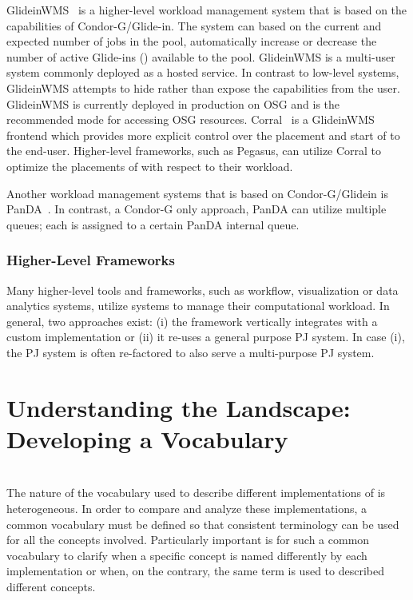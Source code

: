 \documentclass{sig-alternate}
\begin{document}
GlideinWMS~\cite{1742-6596-119-6-062044} is a higher-level workload management
system that is based on the \pilot capabilities of Condor-G/Glide-in. The
system can based on the current and expected number of jobs in the pool,
automatically increase or decrease the number of active Glide-ins (\pilots)
available to the pool. GlideinWMS is a multi-user \pilotjob system commonly
deployed as a hosted service. In contrast to low-level \pilotjob systems,
GlideinWMS attempts to hide rather than expose the \pilot capabilities from
the user. GlideinWMS is currently deployed in production on OSG and is the
recommended mode for accessing OSG resources.
Corral~\cite{Rynge:2011:EUG:2116259.2116599} is a GlideinWMS frontend which
provides more explicit control over the placement and start of \pilots to the
end-user. Higher-level frameworks, such as Pegasus, can utilize Corral to
optimize the placements of \pilots with respect to their workload.

Another workload management systems that is based on Condor-G/Glidein is
PanDA~\cite{1742-6596-331-7-072069}. In contrast, a Condor-G only approach,
PanDA can utilize multiple queues; each \pilot is assigned to a certain PanDA
internal queue.

\subsubsection{Higher-Level Frameworks}

Many higher-level tools and frameworks, such as workflow, visualization or
data analytics systems, utilize \pilotjob systems to manage their
computational workload. In general, two approaches exist: (i) the framework
vertically integrates with a custom \pilotjob implementation or (ii) it
re-uses a general purpose PJ system. In case (i), the PJ system is often
re-factored to also serve a multi-purpose PJ system.


\section{Understanding the Landscape: Developing a Vocabulary}
\label{sec:vocab}


 \\
The nature of the vocabulary used to describe different implementations of  \pilotjobs is heterogeneous. In order to compare and analyze these implementations, a common vocabulary must be defined so that consistent terminology can be used for all the concepts involved. Particularly important is for such a common vocabulary to clarify when a specific concept is named differently by each implementation or when, on the contrary, the same term is used to described different concepts. 
\end{document}

